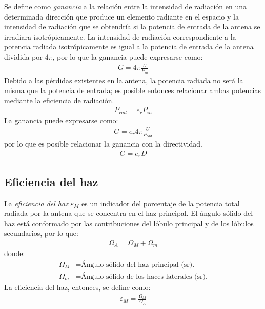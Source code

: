 Se define como \emph{ganancia} a la relación entre la intensidad de radiación en una determinada dirección que produce un elemento radiante en el espacio y la intensidad de radiación que se obtendría si la potencia de entrada de la antena se irradiara isotrópicamente. La intensidad de radiación correspondiente a la potencia radiada isotrópicamente es igual a la potencia de entrada de la antena dividida por $4\pi$, por lo que la ganancia puede expresarse como:
\begin{align}
G = 4\pi\frac{U}{P_{in}}
\label{ec_intro:27}
\end{align}
Debido a las pérdidas existentes en la antena, la potencia radiada no será la misma que la potencia de entrada; es posible entonces relacionar ambas potencias mediante la eficiencia de radiación.
\begin{align}
P_{rad} = e_rP_{in}
\label{ec_intro:28}
\end{align}
La ganancia puede expresarse como:
\begin{align}
G = e_r4\pi\frac{U}{P_{rad}}
\label{ec_intro:29}
\end{align}
por lo que es posible relacionar la ganancia con la directividad.
\begin{align}
G = e_rD
\label{ec_intro:30}
\end{align}

\subsection{Eficiencia del haz}
\label{subsec_intro_efi_haz}

La \emph{eficiencia del haz} $\varepsilon_M$ es un indicador del porcentaje de la potencia total radiada por la antena que se concentra en el haz principal. El ángulo sólido del haz está conformado por las contribuciones del lóbulo principal y de los lóbulos secundarios, por lo que:
\begin{align}
\Omega_A = \Omega_M + \Omega_m
\label{ec_intro:31}
\end{align}
donde:
\begin{align*}
\Omega_M &= \text{Ángulo sólido del haz principal (sr).}\\
\Omega_m &= \text{Ángulo sólido de los haces laterales (sr).}
\end{align*}
La eficiencia del haz, entonces, se define como:
\begin{align}
\varepsilon_M = \frac{\Omega_M}{\Omega_A}
\label{ec_intro:32}
\end{align}

